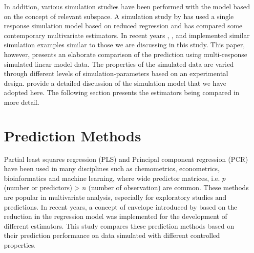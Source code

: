\documentclass[review]{elsarticle}
\begin{document}
In addition, various simulation studies have been performed with the
model based on the concept of relevant subspace. A simulation study by
\citet{Alm_y_1996} has used a single response simulation model based on
reduced regression and has compared some contemporary multivariate
estimators. In recent years \citet{helland2012near},
\citet{saebo2015simrel}, \citet{helland2016algorithms} and
\citet{Rimal2018} implemented similar simulation examples similar to
those we are discussing in this study. This paper, however, presents an
elaborate comparison of the prediction using multi-response simulated
linear model data. The properties of the simulated data are varied
through different levels of simulation-parameters based on an
experimental design. \citet{Rimal2018} provide a detailed discussion of
the simulation model that we have adopted here. The following section
presents the estimators being compared in more detail.

\section{Prediction Methods}\label{prediction-methods}

Partial least squares regression (PLS) and Principal component
regression (PCR) have been used in many disciplines such as
chemometrics, econometrics, bioinformatics and machine learning, where
wide predictor matrices, i.e. \(p\) (number or predictors)
\textgreater{} \(n\) (number of observation) are common. These methods
are popular in multivariate analysis, especially for exploratory studies
and predictions. In recent years, a concept of envelope introduced by
\citet{Cook2007a} based on the reduction in the regression model was
implemented for the development of different estimators. This study
compares these prediction methods based on their prediction performance
on data simulated with different controlled properties.
\end{document}
